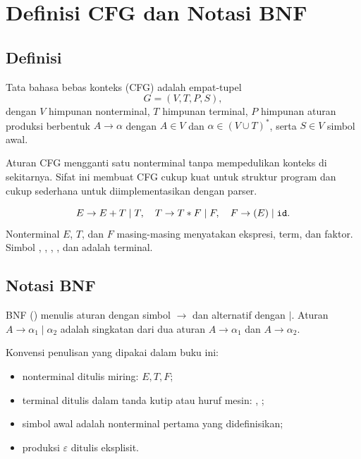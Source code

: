 \section{Definisi CFG dan Notasi BNF}
\label{sec:ch08-cfg}

\subsection{Definisi}

\begin{definisi}
Tata bahasa bebas konteks (CFG) adalah empat-tupel
\[
G = (V, T, P, S),
\]
dengan \(V\) himpunan nonterminal, \(T\) himpunan terminal,
\(P\) himpunan aturan produksi berbentuk \(A \to \alpha\) dengan
\(A \in V\) dan \(\alpha \in (V \cup T)^{*}\), serta \(S \in V\)
simbol awal.
\end{definisi}

Aturan CFG mengganti satu nonterminal tanpa mempedulikan konteks di
sekitarnya. Sifat ini membuat CFG cukup kuat untuk struktur program
dan cukup sederhana untuk diimplementasikan dengan parser.

\begin{contoh}
\[
E \to E + T \mid T, \quad
T \to T * F \mid F, \quad
F \to (E) \mid \texttt{id}.
\]
Nonterminal \(E\), \(T\), dan \(F\) masing-masing menyatakan
ekspresi, term, dan faktor. Simbol , \code{+}, \code{*},
\code{(}, dan \code{)} adalah terminal.
\end{contoh}

\subsection{Notasi BNF}

BNF () menulis aturan dengan simbol
\(\to\) dan alternatif dengan \(\mid\). Aturan
\(A \to \alpha_1 \mid \alpha_2\) adalah singkatan dari dua aturan
\(A \to \alpha_1\) dan \(A \to \alpha_2\).

Konvensi penulisan yang dipakai dalam buku ini:
\begin{itemize}[leftmargin=*]
  \item nonterminal ditulis miring: \(E, T, F\);
  \item terminal ditulis dalam tanda kutip atau huruf mesin:
        , \code{+};
  \item simbol awal adalah nonterminal pertama yang didefinisikan;
  \item produksi \(\varepsilon\) ditulis eksplisit.
\end{itemize}

